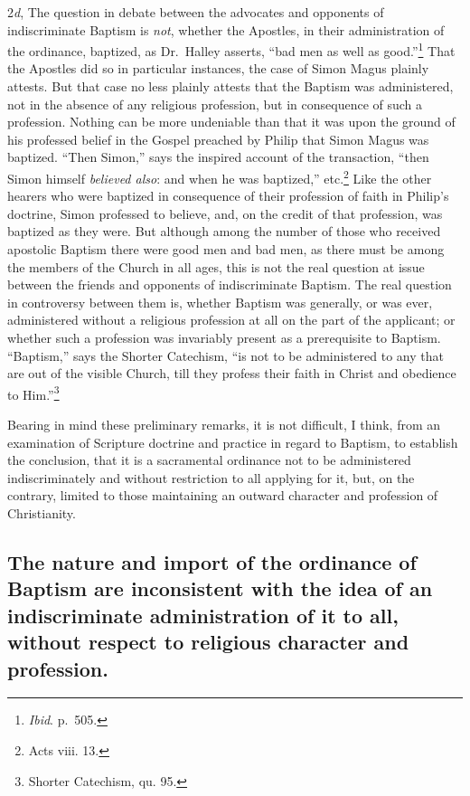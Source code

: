 \documentclass[english,]{book}
\begin{document}
2\emph{d}, The question in debate between the advocates and opponents of indiscriminate Baptism is \emph{not}, whether the Apostles, in their administration of the ordinance, baptized, as Dr.~Halley asserts, ``bad men as well as good.''\footnote{\emph{Ibid}. p.~505.} That the Apostles did so in particular instances, the case of Simon Magus plainly attests. But that case no less plainly attests that the Baptism was administered, not in the absence of any religious profession, but in consequence of such a profession. Nothing can be more undeniable than that it was upon the ground of his professed belief in the Gospel preached by Philip that Simon Magus was baptized. ``Then Simon,'' says the inspired account of the transaction, ``then Simon himself \emph{believed also}: and when he was baptized,'' etc.\footnote{Acts viii. 13.} Like the other hearers who were baptized in consequence of their profession of faith in Philip's doctrine, Simon professed to believe, and, on the credit of that profession, was baptized as they were. But although among the number of those who received apostolic Baptism there were good men and bad men, as there must be among the members of the Church in all ages, this is not the real question at issue between the friends and opponents of indiscriminate Baptism. The real question in controversy between them is, whether Baptism was generally, or was ever, administered without a religious profession at all on the part of the applicant; or whether such a profession was invariably present as a prerequisite to Baptism. ``Baptism,'' says the Shorter Catechism, ``is not to be administered to any that are out of the visible Church, till they profess their faith in Christ and obedience to Him.''\footnote{Shorter Catechism, qu. 95.}

Bearing in mind these preliminary remarks, it is not difficult, I think, from an examination of Scripture doctrine and practice in regard to Baptism, to establish the conclusion, that it is a sacramental ordinance not to be administered indiscriminately and without restriction to all applying for it, but, on the contrary, limited to those maintaining an outward character and profession of Christianity.

\hypertarget{the-nature-and-import-of-the-ordinance-of-baptism-are-inconsistent-with-the-idea-of-an-indiscriminate-administration-of-it-to-all-without-respect-to-religious-character-and-profession.}{%
\subsection{The nature and import of the ordinance of Baptism are inconsistent with the idea of an indiscriminate administration of it to all, without respect to religious character and profession.}\label{the-nature-and-import-of-the-ordinance-of-baptism-are-inconsistent-with-the-idea-of-an-indiscriminate-administration-of-it-to-all-without-respect-to-religious-character-and-profession.}}
\end{document}
